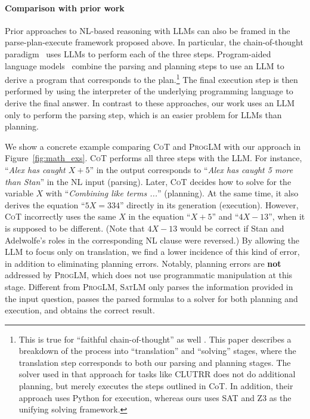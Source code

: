 \documentclass{article}
\theoremstyle{definition}
\newcommand{\cotlm}{\textsc{CoT}}
\newcommand{\satlm}{\textsc{SatLM}}
\newcommand{\pallm}{\textsc{ProgLM}}
\begin{document}
\paragraph{Comparison with prior work} Prior approaches to NL-based reasoning with LLMs can also be framed in the parse-plan-execute framework proposed above. In particular, the chain-of-thought paradigm~\citep{scratch,chain} uses LLMs to perform each of the three steps. Program-aided language models~\citep{pal,progcot,faithfulcot} combine the parsing and planning steps to use an LLM to derive a program that corresponds to the plan.\footnote{This is true for ``faithful chain-of-thought'' as well \citep{faithfulcot}. This paper describes a breakdown of the process into ``translation'' and ``solving'' stages, where the translation step corresponds to both our parsing and planning stages. The solver used in that approach for tasks like CLUTRR does not do additional planning, but merely executes the steps outlined in CoT. In addition, their approach uses Python for execution, whereas ours uses SAT and Z3 as the unifying solving framework.} The final execution step is then performed by using the interpreter of the underlying programming language to derive the final answer. In contrast to these approaches, our work uses an LLM only to perform the parsing step, which is an easier problem for LLMs than planning.

We show a concrete example comparing \cotlm{} and \pallm{} with our approach in Figure~\ref{fig:math_exs}. \cotlm{} performs all three steps with the LLM. For instance, ``\emph{Alex has caught
$X + 5$}'' in the output corresponds to ``\emph{Alex has caught 5 more than Stan}'' in the NL input (parsing). Later, \cotlm{} decides how to solve for the variable $X$ with ``\emph{Combining like terms ...}'' (planning). At the same time, it also derives the equation ``$5X = 334$'' directly in its generation (execution). However, \cotlm{} incorrectly uses the same $X$ in the equation ``$X + 5$'' and ``$4X - 13$'', when it is supposed to be different. (Note that $4X-13$ would be correct if Stan and Adelwolfe's roles in the corresponding NL clause were reversed.) By allowing the LLM to focus only on translation, we find a lower incidence of this kind of error, in addition to eliminating planning errors. Notably, planning errors are \textbf{not} addressed by \pallm{}, which does not use programmatic manipulation at this stage. %
Different from \pallm{}, \satlm{} only parses the information provided in the input question, passes the parsed formulas to a solver for both planning and execution, and obtains the correct result.
\end{document}
